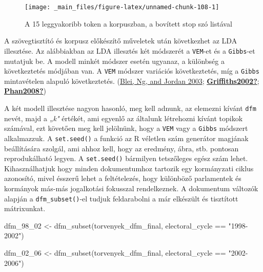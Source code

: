 \documentclass[
]{book}
\newenvironment{Shaded}{\begin{snugshade}}{\end{snugshade}}
\newcommand{\FunctionTok}[1]{\textcolor[rgb]{0.00,0.00,0.00}{#1}}
\newcommand{\NormalTok}[1]{#1}
\newcommand{\OtherTok}[1]{\textcolor[rgb]{0.56,0.35,0.01}{#1}}
\newcommand{\SpecialCharTok}[1]{\textcolor[rgb]{0.00,0.00,0.00}{#1}}
\newcommand{\StringTok}[1]{\textcolor[rgb]{0.31,0.60,0.02}{#1}}
\begin{document}
\begin{figure}

{\centering \texttt{[image: \_main\_files/figure-latex/unnamed-chunk-108-1]} 

}

\caption{A 15 leggyakoribb token a korpuszban, a bovített stop szó listával}\label{fig:unnamed-chunk-108}
\end{figure}

A szövegtisztító és korpusz előkészítő műveletek után következhet az LDA
illesztése. Az alábbiakban az LDA illesztés két módszerét a
\texttt{VEM}-et és a \texttt{Gibbs}-et mutatjuk be. A modell minkét
módszer esetén ugyanaz, a különbség a következtetés módjában van. A
\texttt{VEM} módszer variációs következtetés, míg a \texttt{Gibbs}
mintavételen alapuló következtetés.
(\protect\hyperlink{ref-blei2003}{Blei, Ng, and Jordan 2003};
\protect\hyperlink{ref-Griffiths2002}{\textbf{Griffiths2002?}};
\protect\hyperlink{ref-Phan2008}{\textbf{Phan2008?}})

A két modell illesztése nagyon hasonló, meg kell adnunk, az elemezni
kívánt \texttt{dfm} nevét, majd a \emph{„k"} értékét, ami egyenlő az
általunk létrehozni kívánt topikok számával, ezt követően meg kell
jelölnünk, hogy a \texttt{VEM} vagy a \texttt{Gibbs} módszert
alkalmazzuk. A \texttt{set.seed()} a funkció az R véletlen szám
generátor magjának beállítására szolgál, ami ahhoz kell, hogy az
eredmény, ábra, stb. pontosan reprodukálható legyen. A
\texttt{set.seed()} bármilyen tetszőleges egész szám lehet.
Kihasználhatjuk hogy minden dokumentumhoz tartozik egy kormányzati
ciklus azonosító, mivel ésszerű lehet a feltételezés, hogy különböző
parlamentek és kormányok más-más jogalkotási fokusszal rendelkeznek. A
dokumentum változók alapján a \texttt{dfm\_subset()}-el tudjuk
feldarabolni a már elkészült és tisztított mátrixunkat.

\begin{Shaded}
\begin{Highlighting}[]
\NormalTok{dfm\_98\_02 }\OtherTok{\textless{}{-}} \FunctionTok{dfm\_subset}\NormalTok{(torvenyek\_dfm\_final, electoral\_cycle }\SpecialCharTok{==} \StringTok{"1998{-}2002"}\NormalTok{)}

\NormalTok{dfm\_02\_06 }\OtherTok{\textless{}{-}} \FunctionTok{dfm\_subset}\NormalTok{(torvenyek\_dfm\_final, electoral\_cycle }\SpecialCharTok{==} \StringTok{"2002{-}2006"}\NormalTok{)}
\end{Highlighting}
\end{Shaded}
\end{document}
